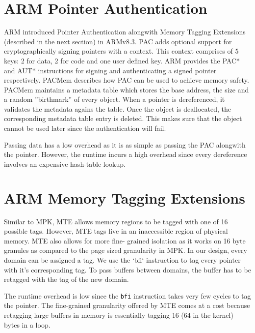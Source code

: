 \section{ARM Pointer Authentication}
ARM introduced Pointer Authentication alongwith Memory Tagging Extensions (described in the next section) in ARMv8.3. PAC adds optional support for cryptographically signing pointers with a context. This context comprises of 5 keys: 2 for data, 2 for code and one user defined key. ARM provides the PAC* and AUT* instructions for signing and authenticating a signed pointer respectively. PACMem \cite{pacmem} describes how PAC can be used to achieve memory safety. PACMem maintains a metadata table which stores the base address, the size and a random ”birthmark” of every object. When a pointer is dereferenced, it validates the metadata agains the table. Once the object is deallocated, the corresponding metadata table entry is deleted. This makes sure that the object cannot be used later since the authentication will fail.

Passing data has a low overhead as it is as simple as passing the PAC alongwith the pointer. However, the runtime incurs a high overhead since every dereference involves an expensive hash-table lookup.

\section{ARM Memory Tagging Extensions}
Similar to MPK, MTE allows memory regions to be tagged with one of 16 possible tags. However, MTE tags live in an inaccessible region of physical memory. MTE also allows for more fine- grained isolation as it works on 16 byte granules as compared to the page sized granularity in MPK. In our design, every domain can be assigned a tag. We use the ‘bfi‘ instruction to tag every pointer with it’s corresponding tag. To pass buffers between domains, the buffer has to be retagged with the tag of the new domain.

The runtime overhead is low since the \lstinline{bfi} instruction takes very few cycles to tag the pointer. The fine-grained granularity offered by MTE comes at a cost because retagging large buffers in memory is essentially tagging 16 (64 in the kernel) bytes in a loop.

